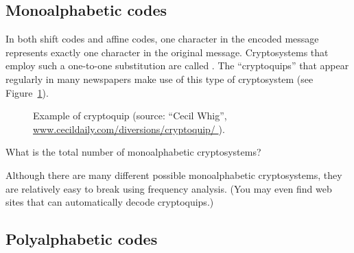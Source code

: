 \subsection{Monoalphabetic codes}

In both shift codes and affine codes, one character in the encoded message represents exactly one character in the original message. Cryptosystems that employ such a one-to-one substitution are called .
The ``cryptoquips''  that appear regularly in many newspapers make use of this type of cryptosystem (see Figure~\ref{fig:cryptoquip}).

\begin{figure}[h]
\caption{Example of cryptoquip (source: ``Cecil Whig'', \url{www.cecildaily.com/diversions/cryptoquip/ }).}
\label{fig:cryptoquip}
\end{figure}

\begin{exercise}{}
What is the total number of monoalphabetic cryptosystems?
\end{exercise}
Although there are many different possible monoalphabetic cryptosystems, they are relatively easy to break using frequency analysis. (You may even find web sites that can automatically decode cryptoquips.)


\subsection{Polyalphabetic codes}

